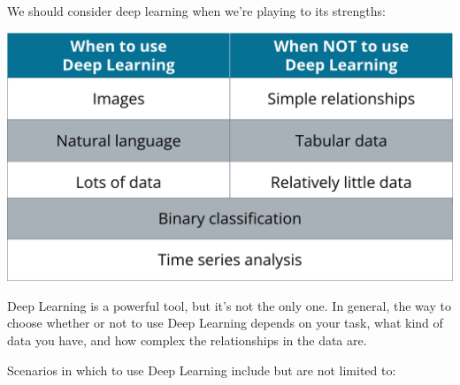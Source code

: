 We should consider deep learning when we're playing to its strengths:

\includegraphics[width=1\linewidth]{img//intro/screen-shot-2022-06-27-at-11.03.33-am.jpeg}

Deep Learning is a powerful tool, but it's not the only one. In general, the way to choose whether or not to use Deep Learning depends on your task, what kind of data you have, and how complex the relationships in the data are.

Scenarios in which to use Deep Learning include but are not limited to:

